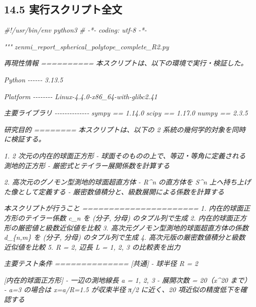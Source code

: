 \documentclass[
  12pt,
  a4paper,
]{article}
\newenvironment{Shaded}{}{}
\newcommand{\CommentTok}[1]{\textcolor[rgb]{0.38,0.63,0.69}{\textit{#1}}}
\begin{document}
\subsection{14.5
実行スクリプト全文}\label{ux5b9fux884cux30b9ux30afux30eaux30d7ux30c8ux5168ux6587}

\begin{Shaded}
\begin{Highlighting}[]
\CommentTok{\#!/usr/bin/env python3}
\CommentTok{\# {-}*{-} coding: utf{-}8 {-}*{-}}

\CommentTok{"""}
\CommentTok{zenmi\_report\_spherical\_polytope\_complete\_R2.py}

\CommentTok{再現性情報}
\CommentTok{==========}
\CommentTok{本スクリプトは、以下の環境で実行・検証した。}

\CommentTok{Python}
\CommentTok{{-}{-}{-}{-}{-}{-}}
\CommentTok{3.13.5}

\CommentTok{Platform}
\CommentTok{{-}{-}{-}{-}{-}{-}{-}{-}}
\CommentTok{Linux{-}4.4.0{-}x86\_64{-}with{-}glibc2.41}

\CommentTok{主要ライブラリ}
\CommentTok{{-}{-}{-}{-}{-}{-}{-}{-}{-}{-}{-}{-}{-}{-}}
\CommentTok{sympy == 1.14.0}
\CommentTok{scipy == 1.17.0}
\CommentTok{numpy == 2.3.5}

\CommentTok{研究目的}
\CommentTok{========}
\CommentTok{本スクリプトは、以下の 2 系統の幾何学的対象を同時に検証する。}

\CommentTok{1. 2 次元の内在的球面正方形}
\CommentTok{   {-} 球面そのものの上で、等辺・等角に定義される測地的正方形}
\CommentTok{   {-} 厳密式とテイラー展開係数を計算する}

\CommentTok{2. 高次元のグノモン型測地的球面超直方体}
\CommentTok{   {-} R\^{}n の直方体を S\^{}n 上へ持ち上げた像として定義する}
\CommentTok{   {-} 厳密数値積分と、級数展開による係数を計算する}

\CommentTok{本スクリプトが行うこと}
\CommentTok{======================}
\CommentTok{1. 内在的球面正方形のテイラー係数 c\_n を (分子, 分母) のタプル列で生成}
\CommentTok{2. 内在的球面正方形の厳密値と級数近似値を比較}
\CommentTok{3. 高次元グノモン型測地的球面超直方体の係数 d\_\{n,m\} を (分子, 分母) のタプル列で生成}
\CommentTok{4. 高次元版の厳密数値積分と級数近似値を比較}
\CommentTok{5. R = 2, 辺長 L = 1, 2, 3 の比較表を出力}

\CommentTok{主要テスト条件}
\CommentTok{==============}
\CommentTok{[共通]}
\CommentTok{{-} 球半径 R = 2}

\CommentTok{[内在的球面正方形]}
\CommentTok{{-} 一辺の測地線長 a = 1, 2, 3}
\CommentTok{{-} 展開次数 = 20（x\^{}20 まで）}
\CommentTok{{-} a=3 の場合は x=a/R=1.5 が収束半径 π/2 に近く、20 項近似の精度低下を確認する}


\end{Highlighting}
\end{Shaded}
\end{document}
